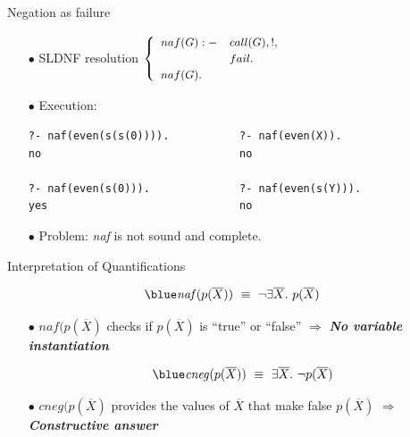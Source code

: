\documentclass[pdf,slideColor,contemporain]{prosper}
\begin{document}
\begin{slide}{Negation as failure}
\begin{itemize}

\vspace{-0.2cm}
\item[{\blue $\bullet$}] SLDNF resolution  $
         {\small
         \begin{cases}
         \begin{array}{ll}
              naf(G) :- & call(G),!, \\
                        & fail. \\
              naf(G). &
          \end{array}
          \end{cases}} $\\

\vspace{0.2cm}

\item[{\blue $\bullet$}] Execution:
\begin{tiny}
\begin{verbatim}
?- naf(even(s(s(0)))).           ?- naf(even(X)).
no                               no

?- naf(even(s(0))).              ?- naf(even(s(Y))).
yes                              no
\end{verbatim}
\end{tiny}
\vspace{0.2cm}
\item[{\blue $\bullet$}] Problem: \emph{naf} is not sound and complete.
\end{itemize}
\end{slide}

\begin{slide}{Interpretation of Quantif{ic}ations}

\vspace{0.5cm}

\[\mathit{\blue naf}(p(\overline{X}))~ \equiv ~ \neg \exists \overline{X}. ~ p(\overline{X})\]
\begin{itemize}

     \item[{\blue $\bullet$}] $naf(p(\overline{X})$ checks if
     $p(\overline{X})$ is ``true'' or ``false''  $\Rightarrow$ \emph{\bf No variable instantiation}
\vspace{0.5cm}

\[\mathit{\blue cneg}(p(\overline{X}))~ \equiv ~ \exists \overline{X}. ~  \neg p(\overline{X})\]
\vspace{-0.4cm}

     \item[{\blue $\bullet$}]  $cneg(p(\overline{X})$ provides the values of
     $\overline{X}$ that make false $p(\overline{X})$ $\Rightarrow$
     \emph{\bf Constructive answer}
\end{itemize}
\end{slide}
\end{document}
